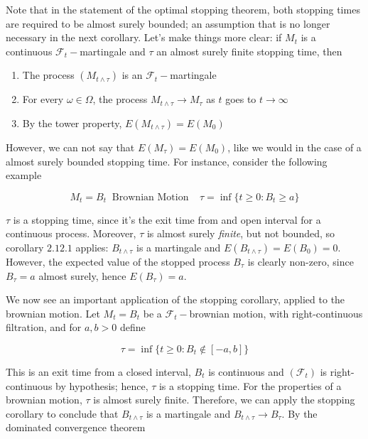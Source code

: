 Note that in the statement of the optimal stopping theorem, both stopping times are required to be almost surely bounded; an assumption that is no longer necessary in the next corollary. Let's make things more clear: if $M_t$ is a continuous $\mathcal{F}_t-$martingale and $\tau$ an almost surely finite stopping time, then
\begin{enumerate}
    \item The process $(M_{t \wedge \tau})$ is an $\mathcal{F}_t-$martingale
    \item For every $\omega \in \Omega$, the process $M_{t \wedge \tau} \to M_{\tau}$ as $t$ goes to $t \to \infty$
    \item By the tower property, $E(M_{t \wedge \tau} ) = E(M_0)$
\end{enumerate}

However, we can not say that $E(M_{\tau}) = E(M_0)$, like we would in the case of a almost surely bounded stopping time. For instance, consider the following example

\begin{equation*}
    M_t = B_t \;\; \text{Brownian Motion} \;\;\;\; \tau = \inf\big\{ t \geq 0 : B_t \geq a\big\}
\end{equation*}

$\tau$ is a stopping time, since it's the exit time from and open interval for a continuous process. Moreover, $\tau$ is almost surely \textit{finite}, but not bounded, so corollary $2.12.1$ applies: $B_{t \wedge \tau}$ is a martingale and $E(B_{t \wedge \tau}) = E(B_0) = 0$. However, the expected value of the stopped process $B_{\tau}$ is clearly non-zero, since $B_{\tau} = a$ almost surely, hence $E(B_{\tau}) = a$. 

We now see an important application of the stopping corollary, applied to the brownian motion. Let $M_t = B_t$ be a $\mathcal{F}_t-$brownian motion, with right-continuous filtration, and for $a,b > 0$ define 

\begin{equation*}
    \tau = \inf\big\{ t \geq 0 : B_t \notin [-a,b] \big\}
\end{equation*}

This is an exit time from a closed interval, $B_t$ is continuous and $(\mathcal{F}_t)$ is right-continuous by hypothesis; hence, $\tau$ is a stopping time. For the properties of a brownian motion, $\tau$ is almost surely finite. Therefore, we can apply the stopping corollary to conclude that $B_{t \wedge \tau}$ is a martingale and $B_{t \wedge \tau} \to B_{\tau}$. 
By the dominated convergence theorem


